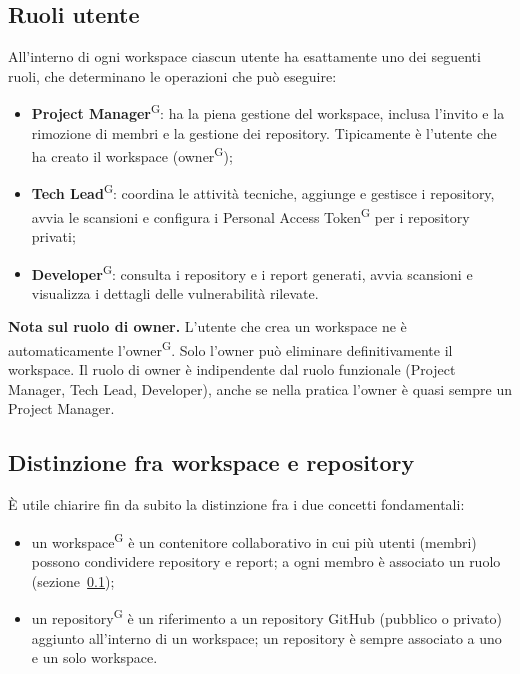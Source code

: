 \documentclass[a4paper, 11pt]{article}
\begin{document}
\subsection{Ruoli utente}
\label{sec:ruoli}
All'interno di ogni workspace ciascun utente ha esattamente uno dei seguenti ruoli, che determinano le operazioni che può eseguire:
\begin{itemize}
    \item \textbf{Project Manager}\textsuperscript{G}: ha la piena gestione del workspace, inclusa l'invito e la rimozione di membri e la gestione dei repository. Tipicamente è l'utente che ha creato il workspace (owner\textsuperscript{G});
    \item \textbf{Tech Lead}\textsuperscript{G}: coordina le attività tecniche, aggiunge e gestisce i repository, avvia le scansioni e configura i Personal Access Token\textsuperscript{G} per i repository privati;
    \item \textbf{Developer}\textsuperscript{G}: consulta i repository e i report generati, avvia scansioni e visualizza i dettagli delle vulnerabilità rilevate.
\end{itemize}

\begin{infobox}
\textbf{Nota sul ruolo di owner.} L'utente che crea un workspace ne è automaticamente l'owner\textsuperscript{G}. Solo l'owner può eliminare definitivamente il workspace. Il ruolo di owner è indipendente dal ruolo funzionale (Project Manager, Tech Lead, Developer), anche se nella pratica l'owner è quasi sempre un Project Manager.
\end{infobox}

\subsection{Distinzione fra workspace e repository}
È utile chiarire fin da subito la distinzione fra i due concetti fondamentali:
\begin{itemize}
    \item un workspace\textsuperscript{G} è un contenitore collaborativo in cui più utenti (membri) possono condividere repository e report; a ogni membro è associato un ruolo (sezione~\ref{sec:ruoli});
    \item un repository\textsuperscript{G} è un riferimento a un repository GitHub (pubblico o privato) aggiunto all'interno di un workspace; un repository è sempre associato a uno e un solo workspace.
\end{itemize}
\end{document}
